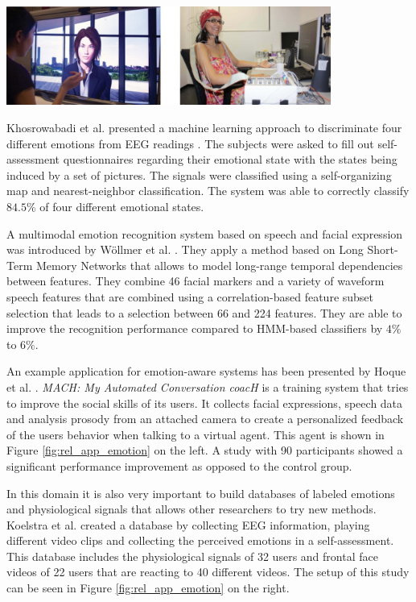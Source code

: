 \begin{minipage}{\linewidth}
\centering
\includegraphics[width=0.8\textwidth]{images/rel_app_emotion}
\label{fig:rel_app_emotion}
\end{minipage}

Khosrowabadi et al. presented a machine learning approach to discriminate four different emotions from EEG readings \cite{khosrowabadi2010eeg}. The subjects were asked to fill out self-assessment questionnaires regarding their emotional state with the states being induced by a set of pictures. The signals were classified using a self-organizing map and nearest-neighbor classification. The system was able to correctly classify $84.5\%$ of four different emotional states.

A multimodal emotion recognition system based on speech and facial expression was introduced by Wöllmer et al.  \cite{wollmer2010context}. They apply a method based on Long Short-Term Memory Networks that allows to model long-range temporal dependencies between features. They combine 46 facial markers and a variety of waveform speech features that are combined using a correlation-based feature subset selection that leads to a selection between 66 and 224 features. They are able to improve the recognition performance compared to HMM-based classifiers by $4\%$ to $6\%$.

An example application for emotion-aware systems has been presented by Hoque et al. \cite{hoque2013mach}. \emph{MACH: My Automated Conversation coacH} is a training system that tries to improve the social skills of its users. It collects facial expressions, speech data and analysis prosody from an attached camera to create a personalized feedback of the users behavior when talking to a virtual agent. This agent is shown in Figure \ref{fig:rel_app_emotion} on the left. A study with 90 participants showed a significant performance improvement as opposed to the control group. 

In this domain it is also very important to build databases of labeled emotions and physiological signals that allows other researchers to try new methods. Koelstra et al. \cite{koelstra2012deap} created a database by collecting EEG information, playing different video clips and collecting the perceived emotions in a self-assessment. This database includes the physiological signals of 32 users and frontal face videos of 22 users that are reacting to 40 different videos. The setup of this study can be seen in Figure \ref{fig:rel_app_emotion} on the right.

